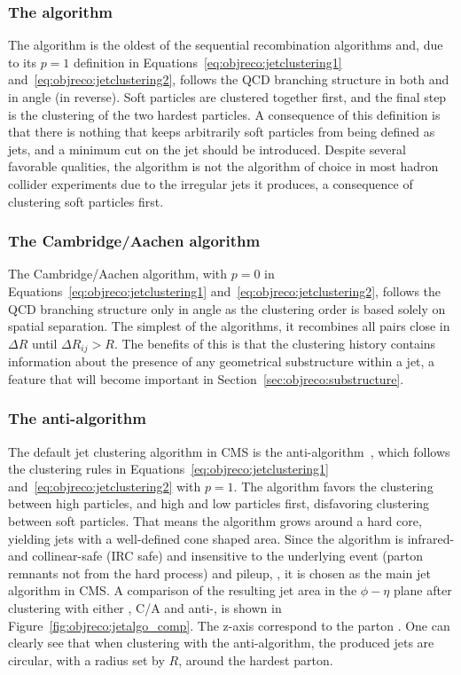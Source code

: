 \subsubsection{The \kt algorithm}
The \kt algorithm is the oldest of the sequential recombination algorithms and, due to its $p=1$ definition in Equations~\ref{eq:objreco:jetclustering1} and~\ref{eq:objreco:jetclustering2}, follows the QCD branching structure in both \PT and in angle (in reverse). Soft particles are clustered together first, and the final step is the clustering of the two hardest particles. A consequence of this definition is that there is nothing that keeps arbitrarily soft particles from being defined as jets, and a minimum cut on the jet \PT should be introduced.
Despite several favorable qualities, the \kt algorithm is not the algorithm of choice in most hadron collider experiments due to the irregular jets it produces, a consequence of clustering soft particles first.

\subsubsection{The Cambridge/Aachen algorithm}
The Cambridge/Aachen algorithm, with $p=0$ in Equations~\ref{eq:objreco:jetclustering1} and~\ref{eq:objreco:jetclustering2}, follows the QCD branching structure only in angle as the clustering order is based solely on spatial separation. The simplest of the algorithms, it recombines all pairs close in $\Delta R$ until $\Delta R_{ij} > R$.
The benefits of this is that the clustering history contains information about the presence of any geometrical substructure within a jet, a feature that will become important in Section~\ref{sec:objreco:substructure}.

\subsubsection{The anti-\kt algorithm}
The default jet clustering algorithm in CMS is the anti-\kt algorithm~\cite{Cacciari:2008gp}, which follows the clustering rules in Equations~\ref{eq:objreco:jetclustering1} and~\ref{eq:objreco:jetclustering2} with $p=1$. The algorithm favors the clustering between high \PT particles, and high and low \PT particles first, disfavoring clustering between soft particles. That means the algorithm grows around a hard core, yielding jets with a well-defined cone shaped area. Since the algorithm is infrared- and collinear-safe (IRC safe) and insensitive to the underlying event (parton remnants not from the hard process) and pileup, , it is chosen as the main jet algorithm in CMS. A comparison of the resulting jet area in the $\phi-\eta$ plane after clustering with either \kt, C/A and anti-\kt, is shown in Figure~\ref{fig:objreco:jetalgo_comp}. The z-axis correspond to the parton \PT. One can clearly see that when clustering with the anti-\kt algorithm, the produced jets are circular, with a radius set by $R$, around the hardest parton.

